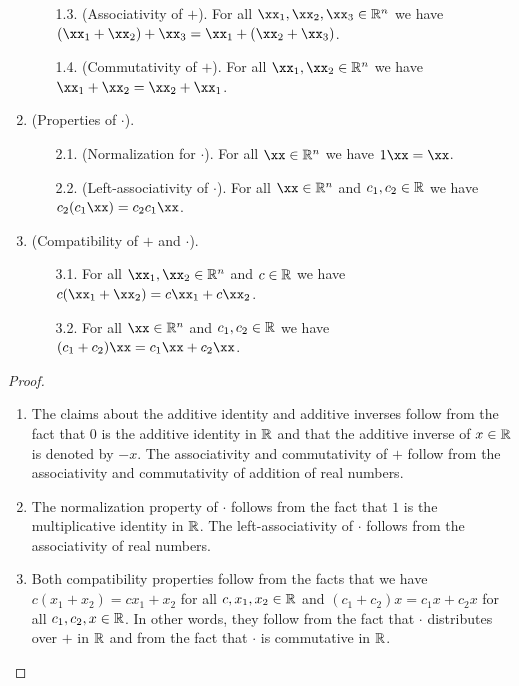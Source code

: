 \begin{theorem}
\begin{enumerate}
\begin{enumerate}
                \item[1.3.] (Associativity of $+$). For all $\xx_1, \xx_2, \xx_3 \in \R^n$ we have $(\xx_1 + \xx_2) + \xx_3 = \xx_1 + (\xx_2 + \xx_3)$.
                \item[1.4.] (Commutativity of $+$). For all $\xx_1, \xx_2 \in \R^n$ we have $\xx_1 + \xx_2 = \xx_2 + \xx_1$.
            \end{enumerate}
            \item (Properties of $\cdot$).
            \begin{enumerate}
                \item[2.1.] (Normalization for $\cdot$). For all $\xx \in \R^n$ we have $1 \xx = \xx$.
                \item[2.2.] (Left-associativity of $\cdot$). For all $\xx \in \R^n$ and $c_1, c_2 \in \mathbb{R}$ we have $c_2 (c_1 \xx) = c_2 c_1 \xx$.
            \end{enumerate}
            \item (Compatibility of $+$ and $\cdot$).
            \begin{enumerate}
                \item[3.1.] For all $\xx_1, \xx_2 \in \R^n$ and $c \in \mathbb{R}$ we have $c(\xx_1 + \xx_2) = c \xx_1 + c \xx_2$.
                \item[3.2.] For all $\xx \in \R^n$ and $c_1, c_2 \in \mathbb{R}$ we have $(c_1 + c_2)\xx = c_1 \xx + c_2 \xx$.
            \end{enumerate}
        \end{enumerate}
\end{theorem}

\begin{proof}
    \mbox{} \\
    \begin{enumerate}
        \item The claims about the additive identity and additive inverses follow from the fact that $0$ is the additive identity in $\mathbb{R}$ and that the additive inverse of $x \in \mathbb{R}$ is denoted by $-x$. The associativity and commutativity of $+$ follow from the associativity and commutativity of addition of real numbers.
        \item The normalization property of $\cdot$ follows from the fact that $1$ is the multiplicative identity in $\mathbb{R}$. The left-associativity of $\cdot$ follows from the associativity of real numbers.
        \item Both compatibility properties follow from the facts that we have $c (x_1 + x_2) = c x_1 + x_2$ for all $c, x_1, x_2 \in \mathbb{R}$ and $(c_1 + c_2) x = c_1 x + c_2 x$ for all $c_1, c_2, x \in \mathbb{R}$. In other words, they follow from the fact that $\cdot$ distributes over $+$ in $\mathbb{R}$ and from the fact that $\cdot$ is commutative in $\mathbb{R}$.
    \end{enumerate} 
\end{proof}

